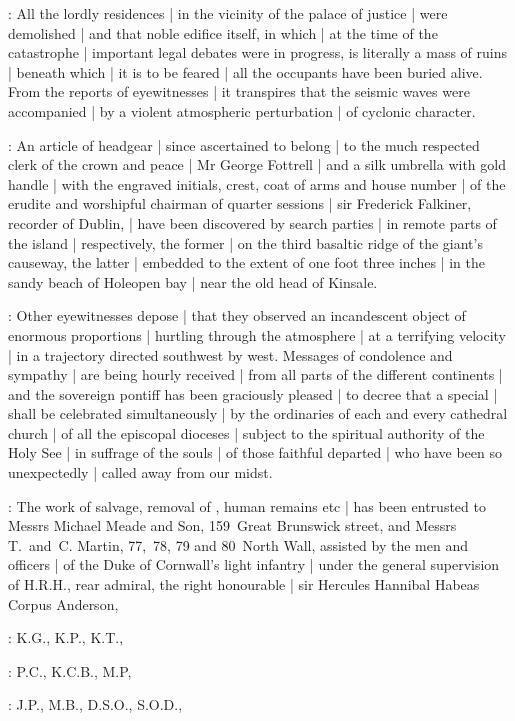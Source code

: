 :
All the lordly residences |
in the vicinity of the palace of justice |
were demolished |
and that noble edifice itself,
in which |
at the time of the catastrophe |
important legal debates were in progress,
is literally a mass of ruins |
beneath which |
it is to be feared |
all the occupants have been buried alive.
From the reports of eyewitnesses |
it transpires that the seismic waves were accompanied
 |
by a violent atmospheric perturbation |
of cyclonic character.

:
An article of headgear |
since ascertained to belong |
to the much respected clerk of the crown and peace |
Mr George Fottrell |
and a silk umbrella with gold handle |
with the engraved initials,
crest,
coat of arms
and house number |
of the erudite and worshipful chairman of quarter sessions |
sir Frederick Falkiner,
recorder of Dublin, |
have been discovered by search parties |
in remote parts of the island |
respectively,
the former |
on the third basaltic ridge of the giant's causeway,
the latter |
embedded to the extent of one foot three inches |
in the sandy beach of Holeopen bay |
near the old head of Kinsale.

:
Other eyewitnesses depose |
that they observed an incandescent object of enormous proportions
 |
hurtling through the atmosphere |
at a terrifying velocity |
in a trajectory directed southwest by west.
Messages of condolence and sympathy |
are being hourly received |
from all parts of the different continents |
and the sovereign pontiff has been graciously pleased |
to decree that a special  |
shall be celebrated simultaneously |
by the ordinaries of each and every cathedral church |
of all the episcopal dioceses |
subject to the spiritual authority of the Holy See |
in suffrage of the souls |
of those faithful departed |
who have been so unexpectedly |
called away from our midst.

:
The work of salvage,
removal of ,
human remains etc |
has been entrusted to Messrs Michael Meade and Son,
159~Great Brunswick street,
and Messrs T.~and~C. Martin,
77,~78, 79 and 80~North Wall,
assisted by the men and officers |
of the Duke of Cornwall's light infantry |
under the general supervision of H.R.H.,
rear admiral,
the right honourable |
sir Hercules Hannibal Habeas Corpus Anderson,

:
K.G.,
K.P.,
K.T.,

:
P.C.,
K.C.B.,
M.P,

:
J.P.,
M.B.,
D.S.O.,
S.O.D.,

